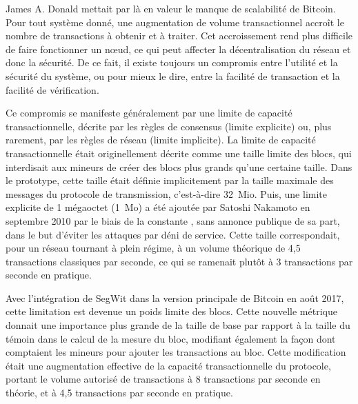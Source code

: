 James A. Donald mettait par là en valeur le manque de scalabilité de Bitcoin. Pour tout système donné, une augmentation de volume transactionnel accroît le nombre de transactions à obtenir et à traiter. Cet accroissement rend plus difficile de faire fonctionner un nœud, ce qui peut affecter la décentralisation du réseau et donc la sécurité. De ce fait, il existe toujours un compromis entre l'utilité et la sécurité du système, ou pour mieux le dire, entre la facilité de transaction et la facilité de vérification.

Ce compromis se manifeste généralement par une limite de capacité transactionnelle, décrite par les règles de consensus (limite explicite) ou, plus rarement, par les règles de réseau (limite implicite). La limite de capacité transactionnelle était originellement décrite comme une taille limite des blocs, qui interdisait aux mineurs de créer des blocs plus grands qu'une certaine taille. Dans le prototype, cette taille était définie implicitement par la taille maximale des messages du protocole de transmission, c'est-à-dire 32~Mio. Puis, une limite explicite de 1 mégaoctet (1~Mo) a été ajoutée par Satoshi Nakamoto en septembre 2010 par le biais de la constante , sans annonce publique de sa part, dans le but d'éviter les attaques par déni de service. Cette taille correspondait, pour un réseau tournant à plein régime, à un volume théorique de 4,5 transactions classiques par seconde, ce qui se ramenait plutôt à 3 transactions par seconde en pratique. %

Avec l'intégration de SegWit dans la version principale de Bitcoin en août 2017, cette limitation est devenue un poids limite des blocs. Cette nouvelle métrique donnait une importance plus grande de la taille de base par rapport à la taille du témoin dans le calcul de la mesure du bloc, modifiant également la façon dont comptaient les mineurs pour ajouter les transactions au bloc. Cette modification était une augmentation effective de la capacité transactionnelle du protocole, portant le volume autorisé de transactions à 8 transactions par seconde en théorie, et à 4,5 transactions par seconde en pratique. %

